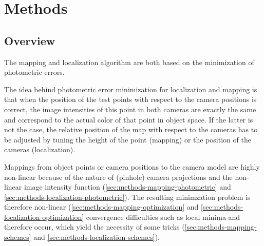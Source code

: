 \chapter{Methods}

\section{Overview}

The mapping and localization algorithm are both based on the minimization of
photometric errors.

The idea behind photometric error minimization for localization and mapping is
that when the position of the test points with respect to the camera
positions is correct, the image intensities of this point in both cameras are
exactly the same and correspond to the actual color of that point in object
space. 
If the latter is not the case, the relative position of the map with respect to 
the cameras has to be adjusted by tuning the height of the point (mapping) or 
the position of the cameras (localization).

Mappings from object points or camera positions to the camera model are highly
non-linear because of the nature of (pinhole) camera projections and the
non-linear image intensity function (\ref{sec:methods-mapping-photometric} and
\ref{sec:methods-localization-photometric}). The resulting minimzation problem
is therefore non-linear (\ref{sec:methods-mapping-optimization} and
\ref{sec:methods-localization-optimization} convergence difficulties such as
local minima and therefore occur, which yield the necessity of some tricks
(\ref{sec:methods-mapping-schemes} and \ref{sec:methods-localization-schemes}).
